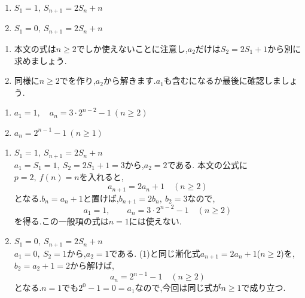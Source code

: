    \noindent {}\par\nobreak
    \begin{enumerate}[label=(\arabic*),parsep=3pt,format=\bookitemlink{example-summation-2}{problem}{answer}]
      \item $\displaystyle S_1=1,\ S_{n+1}=2S_n+n$
      \item $\displaystyle S_1=0,\ S_{n+1}=2S_n+n$
    \end{enumerate}

    \noindent{}\par\nobreak
    \begin{enumerate}[label=(\arabic*),parsep=3pt,format=\bookitemlink{example-summation-2}{hint}{problem}]
      \item 本文の式は$n\ge2$でしか使えないことに注意し,$a_2$だけは$S_2=2S_1+1$から別に求めましょう.
      \item 同様に$n\ge2$でを作り,$a_2$から解きます.$a_1$も含むになるか最後に確認しましょう.
    \end{enumerate}

    \noindent{}\par\nobreak
    \begin{enumerate}[label=(\arabic*),parsep=3pt,format=\bookitemlink{example-summation-2}{answer}{problem}]
      \item $\displaystyle a_1=1,\quad a_n=3\cdot2^{n-2}-1\ (n\ge2)$
      \item $\displaystyle a_n=2^{n-1}-1\ (n\ge1)$
    \end{enumerate}

    \noindent{}\par\nobreak
    \begin{enumerate}[label=(\arabic*),parsep=3pt,format=\bookitemlink{example-summation-2}{solution}{problem}]
    \item $\displaystyle S_1=1,\ S_{n+1}=2S_n+n$\\
        $a_1=S_1=1,\ S_2=2S_1+1=3$から,$a_2=2$である.
        本文の公式に$p=2,\ f(n)=n$を入れると,
        \[
          a_{n+1}=2a_n+1\quad(n\ge2)
        \]
        となる.$b_n=a_n+1$と置けば,$b_{n+1}=2b_n,\ b_2=3$なので,
        \[
          a_1=1,\qquad a_n=3\cdot2^{n-2}-1\quad(n\ge2)
        \]
        を得る.この一般項の式は$n=1$には使えない.
    \item $\displaystyle S_1=0,\ S_{n+1}=2S_n+n$\\
        $a_1=0,\ S_2=1$から,$a_2=1$である.
        (1)と同じ漸化式$a_{n+1}=2a_n+1$($n\ge2$)を,$b_2=a_2+1=2$から解けば,
        \[
          a_n=2^{n-1}-1\quad(n\ge2)
        \]
        となる.$n=1$でも$2^0-1=0=a_1$なので,今回は同じ式が$n\ge1$で成り立つ.
    \end{enumerate}
